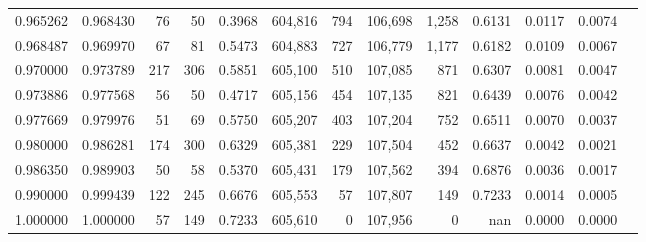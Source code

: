 \begin{tabular}{rrrrrrrrrrrrr}
0.965262 & 0.968430 &    76 &  50 &                                     0.3968 & 604,816 &     794 & 106,698 &   1,258 & 0.6131 & 0.0117 & 0.0074 \\
0.968487 & 0.969970 &    67 &  81 &                                     0.5473 & 604,883 &     727 & 106,779 &   1,177 & 0.6182 & 0.0109 & 0.0067 \\
0.970000 & 0.973789 &   217 & 306 &                                     0.5851 & 605,100 &     510 & 107,085 &     871 & 0.6307 & 0.0081 & 0.0047 \\
0.973886 & 0.977568 &    56 &  50 &                                     0.4717 & 605,156 &     454 & 107,135 &     821 & 0.6439 & 0.0076 & 0.0042 \\
0.977669 & 0.979976 &    51 &  69 &                                     0.5750 & 605,207 &     403 & 107,204 &     752 & 0.6511 & 0.0070 & 0.0037 \\
0.980000 & 0.986281 &   174 & 300 &                                     0.6329 & 605,381 &     229 & 107,504 &     452 & 0.6637 & 0.0042 & 0.0021 \\
0.986350 & 0.989903 &    50 &  58 &                                     0.5370 & 605,431 &     179 & 107,562 &     394 & 0.6876 & 0.0036 & 0.0017 \\
0.990000 & 0.999439 &   122 & 245 &                                     0.6676 & 605,553 &      57 & 107,807 &     149 & 0.7233 & 0.0014 & 0.0005 \\
1.000000 & 1.000000 &    57 & 149 &                                     0.7233 & 605,610 &       0 & 107,956 &       0 &    nan & 0.0000 & 0.0000 \\
\bottomrule
\end{tabular}
